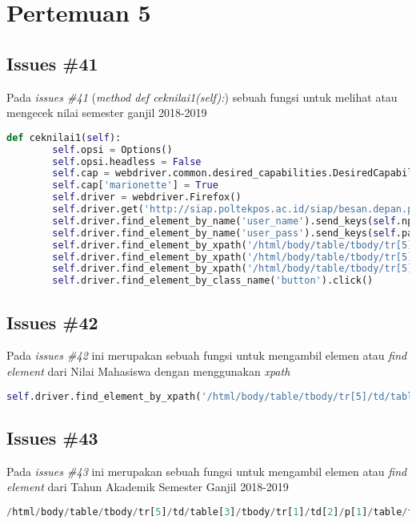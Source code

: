\chapter{Pertemuan 5}

\section{Issues \#41}
Pada \textit{issues \#41} (\textit{method def ceknilai1(self):}) sebuah fungsi untuk melihat atau mengecek nilai semester ganjil 2018-2019
\begin{lstlisting}[language=Python]
def ceknilai1(self):
        self.opsi = Options()
        self.opsi.headless = False
        self.cap = webdriver.common.desired_capabilities.DesiredCapabilities().FIREFOX
        self.cap['marionette'] = True
        self.driver = webdriver.Firefox()
        self.driver.get('http://siap.poltekpos.ac.id/siap/besan.depan.php')
        self.driver.find_element_by_name('user_name').send_keys(self.npm)
        self.driver.find_element_by_name('user_pass').send_keys(self.paswd)
        self.driver.find_element_by_xpath('/html/body/table/tbody/tr[5]/td/table[1]/tbody/tr/td[2]/table[2]/tbody/tr[1]/td[2]/div/form/input[4]').click()
        self.driver.find_element_by_xpath('/html/body/table/tbody/tr[5]/td/table[1]/tbody/tr/td[1]/table[2]/tbody/tr[1]/td[2]/a[5]').click()
        self.driver.find_element_by_xpath('/html/body/table/tbody/tr[5]/td/table[3]/tbody/tr[1]/td[2]/p[1]/table/tbody/tr/td[3]/select/option[5]').click()
        self.driver.find_element_by_class_name('button').click()
\end{lstlisting}

\section{Issues \#42}
Pada \textit{issues \#42} ini merupakan sebuah fungsi untuk mengambil elemen atau \textit{find element} dari Nilai Mahasiswa dengan menggunakan \textit{xpath} 
\begin{lstlisting}[language=Python]
 self.driver.find_element_by_xpath('/html/body/table/tbody/tr[5]/td/table[1]/tbody/tr/td[1]/table[2]/tbody/tr[1]/td[2]/a[5]').click()
\end{lstlisting}

\section{Issues \#43}
Pada \textit{issues \#43} ini merupakan sebuah fungsi untuk mengambil elemen atau \textit{find element} dari Tahun Akademik Semester Ganjil 2018-2019
\begin{lstlisting}[language=Python]
/html/body/table/tbody/tr[5]/td/table[3]/tbody/tr[1]/td[2]/p[1]/table/tbody/tr/td[3]/select/option[5]
\end{lstlisting}


